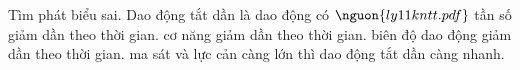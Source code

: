 \begin{ex}
Tìm phát biểu sai. Dao động tắt dần là dao động có $\nguon{ly11 kntt.pdf}$
\choice
{\True tần số giảm dần theo thời gian.}
{cơ năng giảm dần theo thời gian.}
{biên độ dao động giảm dần theo thời gian.}
{ma sát và lực cản càng lớn thì dao động tắt dần càng nhanh.}
\end{ex}
